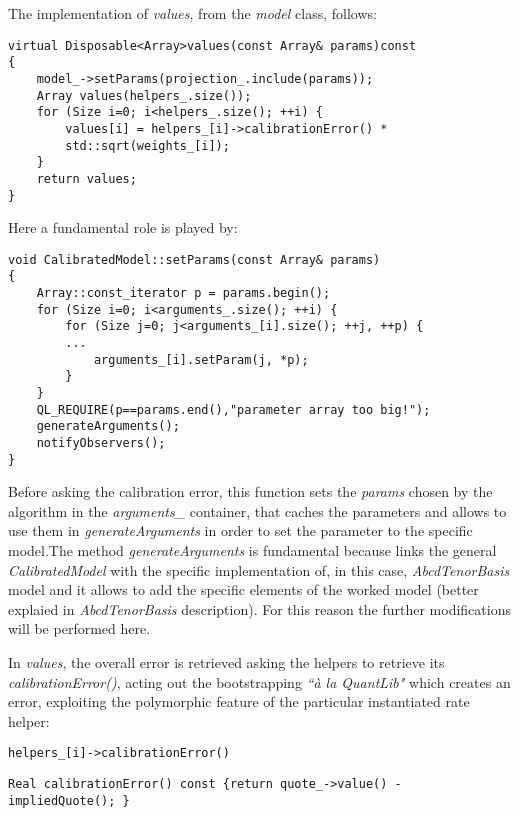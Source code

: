 The implementation of \textit{values}, from the \textit{model} class, follows:

\begin{lstlisting}
virtual Disposable<Array>values(const Array& params)const
{
    model_->setParams(projection_.include(params));
    Array values(helpers_.size());
    for (Size i=0; i<helpers_.size(); ++i) {
        values[i] = helpers_[i]->calibrationError() *
        std::sqrt(weights_[i]);
    }
    return values;
}
\end{lstlisting}

Here a fundamental role is played by:

\begin{lstlisting}
void CalibratedModel::setParams(const Array& params) 
{
    Array::const_iterator p = params.begin();
    for (Size i=0; i<arguments_.size(); ++i) {
        for (Size j=0; j<arguments_[i].size(); ++j, ++p) {
        ...
            arguments_[i].setParam(j, *p);
        }
    }
    QL_REQUIRE(p==params.end(),"parameter array too big!");
    generateArguments();
    notifyObservers();
}
\end{lstlisting}

Before asking the calibration error, this function sets the \textit{params} chosen by the algorithm in the \textit{arguments\_} container, that caches the parameters and allows to use them in \textit{generateArguments} in order to set the parameter to the specific model.The method \textit{generateArguments} is fundamental because links the general \textit{CalibratedModel} with the specific implementation of, in this case, \textit{AbcdTenorBasis} model and it allows to add the specific elements of the worked model (better explaied in \textit{AbcdTenorBasis} description). For this reason the further modifications will be performed here. 

In \textit{values}, the overall error is retrieved asking the helpers to retrieve its \textit{calibrationError()}, acting out the bootstrapping \textit{``à la QuantLib"} which creates an error, exploiting the polymorphic feature of the particular instantiated rate helper:

\begin{lstlisting}
helpers_[i]->calibrationError() 
\end{lstlisting}

\begin{lstlisting}
Real calibrationError() const {return quote_->value() - impliedQuote(); }
\end{lstlisting}

